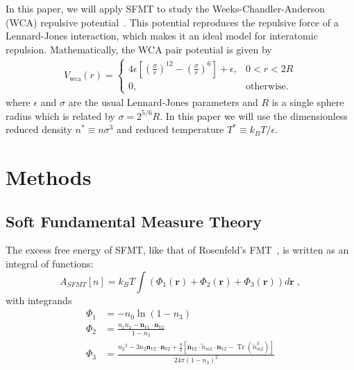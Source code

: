 \documentclass[letterpaper,twocolumn,amsmath,amssymb,prb]{revtex4-1}
\newcommand{\rr}{\textbf{r}}
\begin{document}
In this paper, we will apply SFMT to study the Weeks-Chandler-Anderson
(WCA) repulsive potential~\cite{weeks1971}.  This potential reproduces
the repulsive force of a Lennard-Jones interaction, which makes it an
ideal model for interatomic repulsion.  Mathematically, the WCA
pair potential is given by
\newcommand\erf{\mathrm{erf}}
\newcommand\Vwca{V_{\mathrm{wca}}}
\newcommand\Verf{V_{\erf}}
\begin{align}
  \Vwca(r) =
  \begin{cases}
    4\epsilon \left[ \left(\frac{\sigma}{r}\right)^{12} -
    \left(\frac{\sigma}{r}\right)^{6} \right] + \epsilon, & 0 < r < 2R \\
    0, & \textrm{otherwise}.
  \end{cases}
\label{eq:Vwca}
\end{align}
where $\epsilon$ and $\sigma$ are the usual Lennard-Jones parameters
and $R$ is a single sphere radius which is related by $\sigma =
2^{5/6} R$. In this paper we will use the dimensionless reduced
density $n^* \equiv n \sigma^3$ and reduced temperature $T^* \equiv
k_BT/\epsilon$.

\section{Methods}

\subsection{Soft Fundamental Measure Theory}

The excess free energy of SFMT, like that of Rosenfeld's
FMT~\cite{rosenfeld1989}, is written as an integral of functions: 
\begin{equation}
A_\textit{SFMT}[n] = k_B T \int \left(\Phi_1(\rr) + \Phi_2(\rr) +
\Phi_3(\rr)\right) d\rr \; , \label{eq:sfmt-excess-free}
\end{equation}
with integrands
\begin{align}
\Phi_1 &= -n_0 \ln\left( 1 - n_3\right)\\
\Phi_2 &= \frac{n_1 n_2 - \mathbf{n}_{V1}\cdot\mathbf{n}_{V2}}{1-n_3} \\
\Phi_3 &= \frac{{n_2}^3-3n_2\mathbf{n}_{V2}\cdot\mathbf{n}_{V2}+\frac{9}{2}[\mathbf{n}_{V2}\cdot{\overleftrightarrow{n}_{m2}}\cdot{\mathbf{n}_{V2}}-\operatorname{Tr}({\overleftrightarrow{n}^3_{m2}})]}{24\pi(1-n_3)^2}\\
\label{eq:sfmt-phi3}
\end{align}
\end{document}

